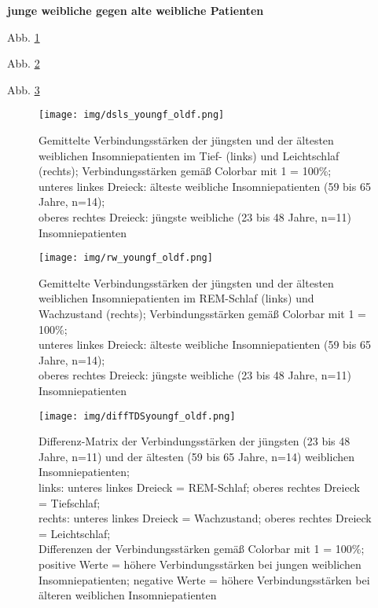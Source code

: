 \textbf{junge weibliche gegen alte weibliche Patienten}

Abb. \ref{fig:dsls_youngf_oldf}

Abb. \ref{fig:rw_youngf_oldf}

Abb. \ref{fig:diffTDSyoungf_oldf}

\begin{figure}[H]
	\centering
	\texttt{[image: img/dsls\_youngf\_oldf.png]}
	\caption[Verbindungsstärken der jüngsten und der ältesten weiblichen Insomniepatienten im Tief- und Leichtschlaf]{Gemittelte Verbindungsstärken der jüngsten und der ältesten weiblichen Insomniepatienten im Tief- (links) und Leichtschlaf (rechts); Verbindungsstärken gemäß Colorbar mit 1 = 100\%;\\unteres linkes Dreieck: älteste weibliche Insomniepatienten (59 bis 65 Jahre, n=14);\\oberes rechtes Dreieck: jüngste weibliche (23 bis 48 Jahre, n=11) Insomniepatienten}
	\label{fig:dsls_youngf_oldf}
\end{figure}

\begin{figure}[H]
	\centering
	\texttt{[image: img/rw\_youngf\_oldf.png]}
	\caption[Verbindungsstärken der jüngsten und der ältesten weiblichen Insomniepatienten im REM-Schlaf und Wachzustand]{Gemittelte Verbindungsstärken der jüngsten und der ältesten weiblichen Insomniepatienten im REM-Schlaf (links) und Wachzustand (rechts); Verbindungsstärken gemäß Colorbar mit 1 = 100\%;\\unteres linkes Dreieck: älteste weibliche Insomniepatienten (59 bis 65 Jahre, n=14);\\oberes rechtes Dreieck: jüngste weibliche (23 bis 48 Jahre, n=11) Insomniepatienten}
	\label{fig:rw_youngf_oldf}
\end{figure}

\begin{figure}[H]
	\centering
	\texttt{[image: img/diffTDSyoungf\_oldf.png]}
	\caption[Differenz-Matrix der Verbindungsstärken der jüngsten und ältesten weiblichen Insomniepatienten]{Differenz-Matrix der Verbindungsstärken der jüngsten (23 bis 48 Jahre, n=11) und der ältesten (59 bis 65 Jahre, n=14) weiblichen Insomniepatienten;\\links: unteres linkes Dreieck = REM-Schlaf; oberes rechtes Dreieck = Tiefschlaf;\\rechts: unteres linkes Dreieck = Wachzustand; oberes rechtes Dreieck = Leichtschlaf;\\Differenzen der Verbindungsstärken gemäß Colorbar mit 1 = 100\%;\\positive Werte = höhere Verbindungsstärken bei jungen weiblichen Insomniepatienten; negative Werte = höhere Verbindungsstärken bei älteren weiblichen Insomniepatienten}
	\label{fig:diffTDSyoungf_oldf}
\end{figure}



